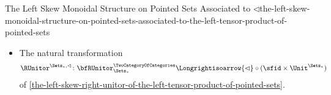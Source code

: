\begin{proposition}{The Left Skew Monoidal Structure on Pointed Sets Associated to $\lhd$}{the-left-skew-monoidal-structure-on-pointed-sets-associated-to-the-left-tensor-product-of-pointed-sets}
\begin{itemize}
            \[
                \LUnitor^{\Sets_{*},\lhd}%
                \colon%
                {\lhd}\circ{(\Unit^{\Sets_{*}}\times\id_{\Sets_{*}})}%
                \Longrightisoarrow%
                \bfLUnitor^{\TwoCategoryOfCategories}_{\Sets_{*}}%
            \]
            of \cref{the-left-skew-left-unitor-of-the-left-tensor-product-of-pointed-sets}.
        \item{}The natural transformation
            \[
                \RUnitor^{\Sets_{*},\lhd}%
                \colon%
                \bfRUnitor^{\TwoCategoryOfCategories}_{\Sets_{*}}%
                \Longrightisoarrow%
                {\lhd}\circ{({\sfid}\times{\Unit^{\Sets_{*}}})}%
            \]
            of \cref{the-left-skew-right-unitor-of-the-left-tensor-product-of-pointed-sets}.
    \end{itemize}
\end{proposition}
